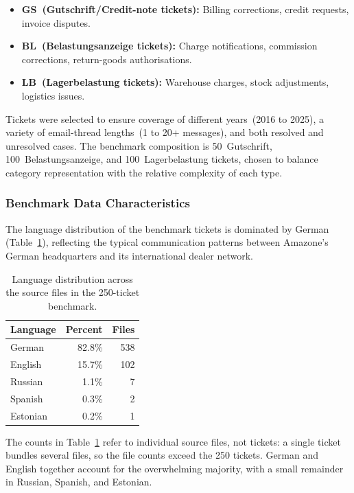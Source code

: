 \begin{itemize}
    \item \textbf{GS~(Gutschrift/Credit-note tickets):} Billing corrections,
          credit requests, invoice disputes.
    \item \textbf{BL~(Belastungsanzeige tickets):} Charge notifications,
          commission corrections, return-goods authorisations.
    \item \textbf{LB~(Lagerbelastung tickets):} Warehouse charges,
          stock adjustments, logistics issues.
\end{itemize}

Tickets were selected to ensure coverage of different years~(2016 to 2025),
a variety of email-thread lengths~(1 to 20+ messages), and both resolved and
unresolved cases.  The benchmark composition is 50~Gutschrift,
100~Belastungsanzeige, and 100~Lagerbelastung tickets, chosen to balance
category representation with the relative complexity of each type.

\subsubsection{Benchmark Data Characteristics}
%
The language distribution of the benchmark tickets is dominated by German
(Table~\ref{tab:language-dist}), reflecting the typical communication
patterns between Amazone's German headquarters and its international
dealer network.

\begin{table}[H]
    \centering
    \caption{Language distribution across the source files in the 250-ticket benchmark.}
    \label{tab:language-dist}
    \begin{tabular}{lrr}
        \hline
        \textbf{Language} & \textbf{Percent} & \textbf{Files} \\
        \hline
        German   & 82.8\% & 538 \\
        English  & 15.7\% & 102 \\
        Russian  &  1.1\% &   7 \\
        Spanish  &  0.3\% &   2 \\
        Estonian &  0.2\% &   1 \\
        \hline
    \end{tabular}
\end{table}

\noindent
The counts in Table~\ref{tab:language-dist} refer to individual source files,
not tickets: a single ticket bundles several files, so the file counts exceed
the 250 tickets.  German and English together account for the overwhelming
majority, with a small remainder in Russian, Spanish, and Estonian.

